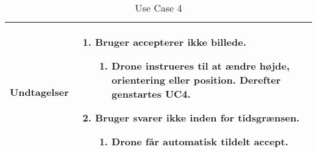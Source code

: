 \begin{table}[H]
\begin{tabular}{| p{3cm}| p{11.5cm}|}
Undtagelser							& 

									\renewcommand{\labelenumi}{\Roman{enumi}:}
									\renewcommand{\labelenumii}{\alph{enumii})}
									\begin{enumerate}[topsep=0.0cm,leftmargin=0.5cm]
										\item Bruger accepterer ikke billede.
											\begin{enumerate}[topsep=0cm, leftmargin=1cm]
												\item Drone instrueres til at ændre højde, orientering eller position. Derefter genstartes UC4.
											\end{enumerate}
										\item Bruger svarer ikke inden for tidsgrænsen.
											\begin{enumerate}[topsep=0cm, leftmargin=1cm]
												\item Drone får automatisk tildelt accept.
											\end{enumerate}
									\end{enumerate} \\\hline	

\end{tabular}
\caption{Use Case 4}
\label{tab:UC4}
\end{table}